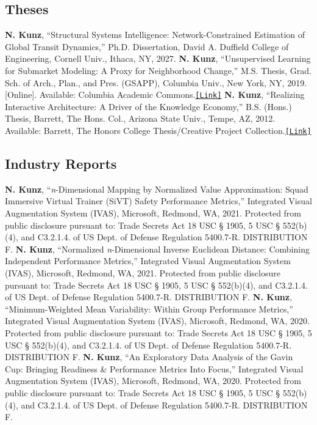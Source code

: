 \documentclass{article}
\begin{document}
    \subsection*{Theses}
        \textbf{N. Kunz}, ``Structural Systems Intelligence: Network-Constrained Estimation of Global Transit Dynamics,'' Ph.D. Dissertation, David A. Duffield College of Engineering, Cornell Univ., Ithaca, NY, 2027.\newline\newline
        \textbf{N. Kunz}, ``Unsupervised Learning for Submarket Modeling: A Proxy for Neighborhood Change,'' M.S. Thesis, Grad. Sch. of Arch., Plan., and Pres. (GSAPP), Columbia Univ., New York, NY, 2019. [Online]. Available: Columbia Academic Commons.\space\href{https://doi.org/10.7916/d8-rj87-yx32}{\texttt{[Link]}}\newline\newline
        \textbf{N. Kunz}, ``Realizing Interactive Architecture: A Driver of the Knowledge Economy,'' B.S. (Hons.) Thesis, Barrett, The Hons. Col., Arizona State Univ., Tempe, AZ, 2012. Available: Barrett, The Honors College Thesis/Creative Project Collection.\space\href{https://repository.asu.edu/collections/130}{\texttt{[Link]}}
    \subsection*{Industry Reports}
        \textbf{N. Kunz}, ``\textit{n}-Dimensional Mapping by Normalized Value Approximation: Squad Immersive Virtual Trainer (SiVT) Safety Performance Metrics,'' Integrated Visual Augmentation System (IVAS), Microsoft, Redmond, WA, 2021. Protected from public disclosure pursuant to: Trade Secrets Act 18 USC § 1905, 5 USC § 552(b)(4), and C3.2.1.4. of US Dept. of Defense Regulation 5400.7-R. DISTRIBUTION F.\newline\newline
        \textbf{N. Kunz}, ``Normalized \textit{n}-Dimensional Inverse Euclidean Distance: Combining Independent Performance Metrics,'' Integrated Visual Augmentation System (IVAS), Microsoft, Redmond, WA, 2021. Protected from public disclosure pursuant to: Trade Secrets Act 18 USC § 1905, 5 USC § 552(b)(4), and C3.2.1.4. of US Dept. of Defense Regulation 5400.7-R. DISTRIBUTION F.\newline\newline
        \textbf{N. Kunz}, ``Minimum-Weighted Mean Variability: Within Group Performance Metrics,'' Integrated Visual Augmentation System (IVAS), Microsoft, Redmond, WA, 2020. Protected from public disclosure pursuant to: Trade Secrets Act 18 USC § 1905, 5 USC § 552(b)(4), and C3.2.1.4. of US Dept. of Defense Regulation 5400.7-R. DISTRIBUTION F.\newline\newline
        \textbf{N. Kunz}, ``An Exploratory Data Analysis of the Gavin Cup: Bringing Readiness \& Performance Metrics Into Focus,'' Integrated Visual Augmentation System (IVAS), Microsoft, Redmond, WA, 2020. Protected from public disclosure pursuant to: Trade Secrets Act 18 USC § 1905, 5 USC § 552(b)(4), and C3.2.1.4. of US Dept. of Defense Regulation 5400.7-R. DISTRIBUTION F.
\end{document}
